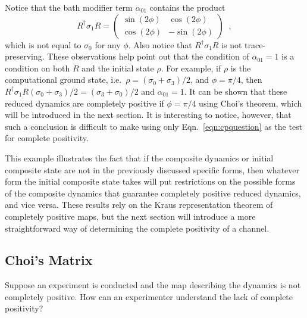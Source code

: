 Notice that the bath modifier term $\alpha_{01}$ contains the product
$$
R^\dagger\sigma_1R = \begin{pmatrix}
\sin{\left(2\phi\right)}&\cos{\left(2\phi\right)}\\
\cos{\left(2\phi\right)}&-\sin{\left(2\phi\right)}
\end{pmatrix}\;\;,
$$
which is not equal to $\sigma_0$ for any $\phi$.  Also notice that $R^\dagger\sigma_1R$ is not trace-preserving.  These observations help point out that the condition of $\alpha_{01} = 1$ is a condition on both $R$ and the initial state $\rho$.  For example, if $\rho$ is the computational ground state, i.e.\ $\rho = (\sigma_0+\sigma_3)/2$, and $\phi=\pi/4$, then $R^\dagger\sigma_1R(\sigma_0+\sigma_3)/2 = (\sigma_3+\sigma_0)/2$ and $\alpha_{01}=1$.  It can be shown that these reduced dynamics are completely positive if $\phi=\pi/4$ using Choi's theorem, which will be introduced in the next section.  It is interesting to notice, however, that such a conclusion is difficult to make using only Eqn.\ \ref{eqn:cpquestion} as the test for complete positivity.

This example illustrates the fact that if the composite dynamics or initial composite state are not in the previously discussed specific forms, then whatever form the initial composite state takes will put restrictions on the possible forms of the composite dynamics that guarantee completely positive reduced dynamics, and vice versa.  These results rely on the Kraus representation theorem of completely positive maps, but the next section will introduce a more straightforward way of determining the complete positivity of a channel.

\subsection{Choi's Matrix}
\label{sec:choi}

Suppose an experiment is conducted and the map describing the dynamics is not completely positive.  How can an experimenter understand the lack of complete positivity?

